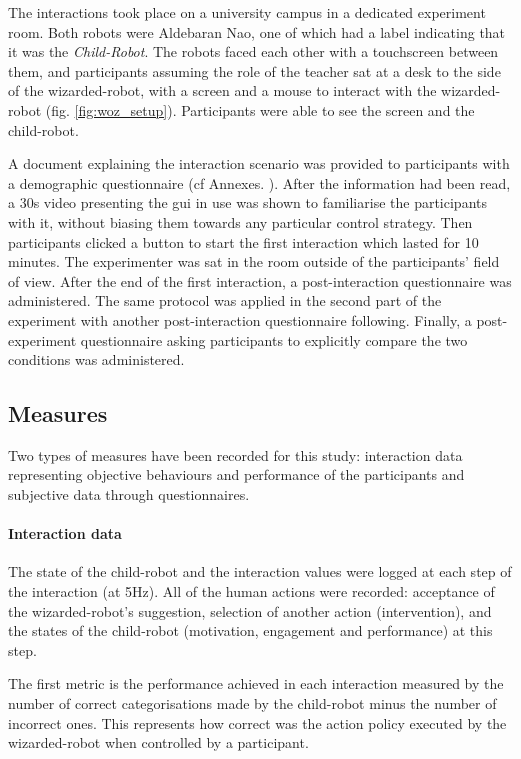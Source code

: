 The interactions took place on a university campus in a dedicated experiment room. Both robots were Aldebaran Nao, one of which had a label indicating that it was the \emph{Child-Robot}. The robots faced each other with a touchscreen between them, and participants assuming the role of the teacher sat at a desk to the side of the wizarded-robot, with a screen and a mouse to interact with the wizarded-robot (fig. \ref{fig:woz_setup}). Participants were able to see the screen and the child-robot.

A document explaining the interaction scenario was provided to participants with a demographic questionnaire (cf Annexes. ). After the information had been read, a 30s video presenting the \gls{gui} in use was shown to familiarise the participants with it, without biasing them towards any particular control strategy. Then participants clicked a button to start the first interaction which lasted for 10 minutes. The experimenter was sat in the room outside of the participants' field of view. After the end of the first interaction, a post-interaction questionnaire was administered. The same protocol was applied in the second part of the experiment with another post-interaction questionnaire following. Finally, a post-experiment questionnaire asking participants to explicitly compare the two conditions was administered.

\subsection{Measures}

Two types of measures have been recorded for this study: interaction data representing objective behaviours and performance of the participants and subjective data through questionnaires.

\paragraph{Interaction data}

The state of the child-robot and the interaction values were logged at each step of the interaction (at 5Hz). All of the human actions were recorded: acceptance of the wizarded-robot's suggestion, selection of another action (intervention), and the states of the child-robot (motivation, engagement and performance) at this step. 

The first metric is the performance achieved in each interaction measured by the number of correct categorisations made by the child-robot minus the number of incorrect ones. This represents how correct was the action policy executed by the wizarded-robot when controlled by a participant.

